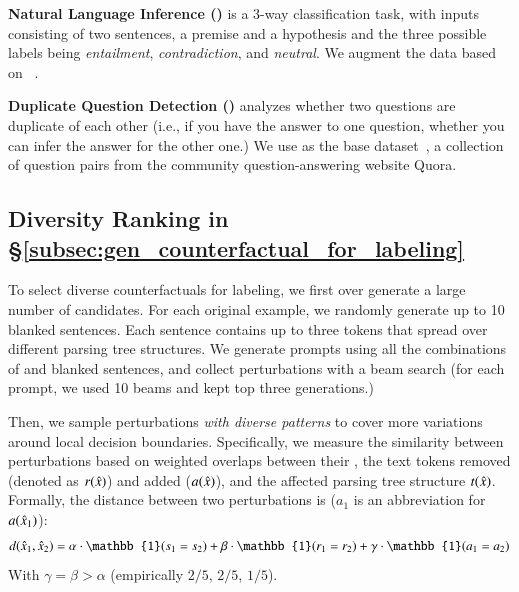 \textbf{Natural Language Inference (\nli)} is a 3-way classification task, with inputs consisting of two sentences, a premise and a hypothesis and the three possible labels being \emph{entailment}, \emph{contradiction}, and \emph{neutral}.
We augment the data based on \dnli~\cite{bowman-etal-2015-large}. 
 
\textbf{Duplicate Question Detection (\qqp)} analyzes whether two questions are duplicate of each other (i.e., if you have the answer to one question, whether you can infer the answer for the other one.) 
We use \dqqp as the base dataset~\cite{wang2018glue}, a collection of question pairs from the community question-answering website Quora.

\subsection{Diversity Ranking in \S\ref{subsec:gen_counterfactual_for_labeling}}

To select diverse counterfactuals for labeling, we first over generate a large number of candidates.
For each original example, we randomly generate up to 10 blanked sentences. Each sentence contains up to three \BLANK tokens that spread over different parsing tree structures.
We generate prompts using all the combinations of \tagstrs and blanked sentences, and collect perturbations with a beam search (for each prompt, we used 10 beams and kept top three generations.)

Then, we sample perturbations \emph{with diverse patterns} to cover more variations around local decision boundaries.
Specifically, we measure the similarity between perturbations based on weighted overlaps between their \tagstrs, the text tokens removed (denoted as $r(\hat{x})$) and added ($a(\hat{x})$), and the affected parsing tree structure $t(\hat{x})$. 
Formally, the distance between two perturbations is ($a_1$ is an abbreviation for $a(\hat{x}_1)$):
$$d(\xp_1, \xp_2) = \alpha\cdot\mathbb{1}(s_1 = s_2) + \beta\cdot\mathbb{1}(r_1 = r_2) + \gamma\cdot\mathbb{1}(a_1=a_2)$$
With $\gamma = \beta > \alpha$ (empirically $2/5$, $2/5$, $1/5$).

